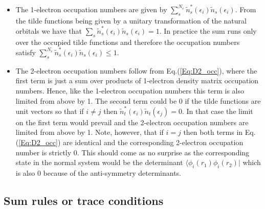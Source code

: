 \documentclass[aip,graphicx]{revtex4-1}
\begin{document}
\begin{itemize} 
    \item The 1-electron occupation numbers are given by $\sum_s^{N_e}\tilde{n}^*_s(\epsilon_i)\tilde{n}_s(\epsilon_i)$. From the tilde functions being given by a unitary transformation of the natural orbitals we have that $\sum_s \tilde{n}^*_s(\epsilon_i)\tilde{n}_s(\epsilon_i) = 1$. In practice the sum runs only over the occupied tilde functions and therefore the occupation numbers satisfy $\sum_s^{N_e}\tilde{n}^*_s(\epsilon_i)\tilde{n}_s(\epsilon_i) \le 1$.
    \item The 2-electron occupation numbers follow from Eq.(\ref{Eq:D2_occ}), where the first term is just a sum over products of 1-electron density matrix occupation numbers. Hence, like the 1-electron occupation numbers this term is also limited from above by 1. The second term could be 0 if the tilde functions are unit vectors so that if $i \ne j$ then $\tilde{n}^*_t(\epsilon_i)\tilde{n}_t(\epsilon_j) = 0$. In that case the limit on the first term would prevail and the 2-electron occupation numbers are limited from above by 1. Note, however, that if $i = j$ then both terms in Eq.(\ref{Eq:D2_occ}) are identical and the corresponding 2-electron occupation number is strictly 0. This should come as no surprise as the corresponding state in the normal system would be the determinant $\langle\phi_i(r_1)\phi_i(r_2)|$ which is also 0 because of the anti-symmetry determinants.
\end{itemize}

\subsection{Sum rules or trace conditions}
\end{document}
